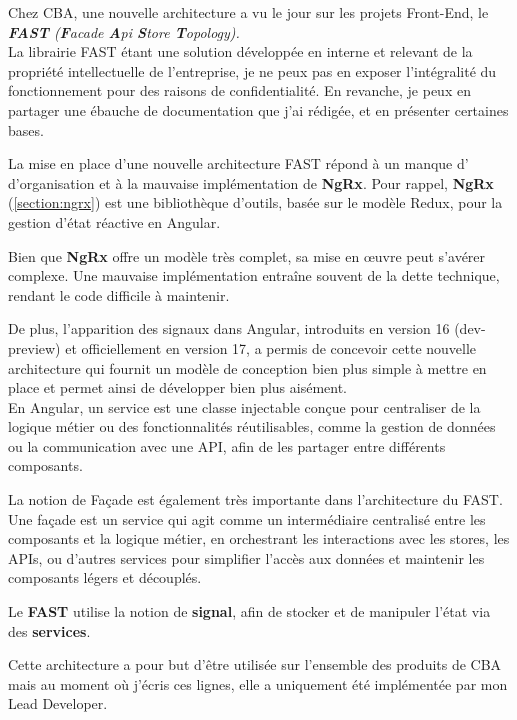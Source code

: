 \documentclass{article}
\begin{document}
Chez CBA, une nouvelle architecture a vu le jour sur les projets Front-End, le \textit{\textbf{FAST} (\textbf{F}acade \textbf{A}pi \textbf{S}tore \textbf{T}opology).} \\

La librairie FAST étant une solution développée en interne et relevant de la propriété intellectuelle de l'entreprise, je ne peux pas en exposer l'intégralité du fonctionnement pour des raisons de confidentialité. En revanche, je peux en partager une ébauche de documentation que j'ai rédigée, et en présenter certaines bases.

La mise en place d'une nouvelle architecture FAST répond à un manque d'
d'organisation et à la mauvaise implémentation de \textbf{NgRx}. Pour rappel, \textbf{NgRx} (\ref{section:ngrx}) est une bibliothèque d'outils, basée sur le modèle Redux, pour la gestion d'état réactive en Angular.

Bien que \textbf{NgRx} offre un modèle très complet, sa mise en œuvre peut s'avérer complexe. Une mauvaise implémentation entraîne souvent de la dette technique, rendant le code difficile à maintenir.

De plus, l'apparition des signaux dans Angular, introduits en version 16 (dev-preview) et officiellement en version 17, a permis de concevoir cette nouvelle architecture qui fournit un modèle de conception bien plus simple à mettre en place et permet ainsi de développer bien plus aisément. \\

En Angular, un service est une classe injectable conçue pour centraliser de la logique métier ou des fonctionnalités réutilisables, comme la gestion de données ou la communication avec une API, afin de les partager entre différents composants.

La notion de Façade est également très importante dans l'architecture du FAST.
Une façade est un service qui agit comme un intermédiaire centralisé entre les composants et la logique métier, en orchestrant les interactions avec les stores, les APIs, ou d'autres services pour simplifier l'accès aux données et maintenir les composants légers et découplés.

Le \textbf{FAST} utilise la notion de \textbf{signal}, afin de stocker et de manipuler l'état via des \textbf{services}.

Cette architecture a pour but d'être utilisée sur l'ensemble des produits de CBA mais au moment où j'écris ces lignes, elle a uniquement été implémentée par mon Lead Developer. \\
\end{document}
